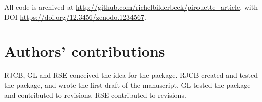All code is archived at 
\url{http://github.com/richelbilderbeek/pirouette_article},
with DOI \url{https://doi.org/12.3456/zenodo.1234567}.

\section{Authors' contributions}

RJCB, GL and RSE conceived the idea for the package. 
RJCB created and tested the package, and wrote the first draft of the manuscript.
GL tested the package and contributed to revisions.
RSE contributed to revisions.




